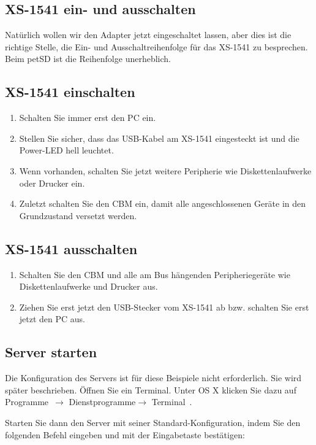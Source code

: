 \documentclass[10pt,a4paper]{scrartcl}		%
\begin{document}
\subsection{XS-1541 ein- und ausschalten}
Natürlich wollen wir den Adapter jetzt eingeschaltet lassen, aber dies
ist die richtige Stelle, die Ein- und Ausschaltreihenfolge für das
XS-1541 zu besprechen. Beim petSD ist die Reihenfolge unerheblich.

\subsection*{XS-1541 einschalten}
\begin{enumerate}
\item Schalten Sie immer erst den PC ein. 
\item Stellen Sie sicher, dass das USB-Kabel am XS-1541 eingesteckt ist und 
die Power-LED hell leuchtet.
\item Wenn vorhanden, schalten Sie jetzt weitere Peripherie wie 
Diskettenlaufwerke oder Drucker ein.
\item Zuletzt schalten Sie den CBM ein, damit alle angeschlossenen
Geräte in den Grundzustand versetzt werden.
\end{enumerate}

\subsection*{XS-1541 ausschalten}
\begin{enumerate}
\item Schalten Sie den CBM und alle am Bus hängenden Peripheriegeräte
wie Diskettenlaufwerke und Drucker aus.
\item Ziehen Sie erst jetzt den USB-Stecker vom XS-1541 ab bzw.
schalten Sie erst jetzt den PC aus.
\end{enumerate}

\subsection{Server starten}
Die Konfiguration des Servers ist für diese Beispiele nicht erforderlich.
Sie wird später beschrieben.
Öffnen Sie ein Terminal. Unter OS X klicken Sie dazu auf \glqq Programme\grqq\  
$\to$ \glqq Dienstprogramme\grqq $\to$ \glqq Terminal\grqq\ .

Starten Sie dann den Server mit seiner Standard-Konfiguration, indem Sie
den folgenden Befehl eingeben und mit der Eingabetaste bestätigen:
\end{document}
